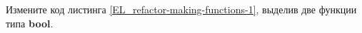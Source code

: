 Измените код листинга \ref{EL_refactor-making-functions-1},
выделив две функции типа \textbf{bool}.
